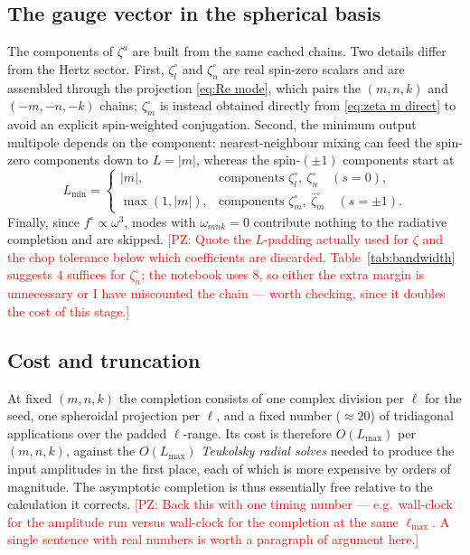 \documentclass[preprint,aps,nofootinbib,a4paper,superscriptaddress,longbibliography,amsfonts, amssymb,amsmath,titlepage]{revtex4-1}
\numberwithin{equation}{section} %
\newcommand{\PZ}[1]{\textcolor{red}{\textsf{[PZ: #1]}}}
\newcommand{\emm}{m}
\def\l{\ensuremath{\ell}}
\def\fHo{f^{\circ}}
\def\zetal{\zeta^{\circ}_{l}}
\def\zetan{\zeta^{\circ}_{n}}
\def\zetam{\zeta^{\circ}_{m}}
\def\zetamb{\bar\zeta^{\circ}_{m}}
\def\wmnk{\omega_{\emm n k}}
\begin{document}
\subsection{The gauge vector in the spherical basis}
\label{sec:kerr zeta}
The components of $\zeta^{a}$ are built from the same cached chains.  Two
details differ from the Hertz sector.  First, $\zetal$ and $\zetan$ are real
spin-zero scalars and are assembled through the projection
\eqref{eq:Re mode}, which pairs the $(\emm,n,k)$ and $(-\emm,-n,-k)$ chains;
$\zetam$ is instead obtained directly from \eqref{eq:zeta m direct} to avoid
an explicit spin-weighted conjugation.  Second, the minimum output multipole
depends on the component: nearest-neighbour mixing can feed the spin-zero
components down to $L=|\emm|$, whereas the spin-$(\pm1)$ components start at
\begin{equation}\label{eq:Lmin}
L_{\min}
=
\begin{cases}
|\emm| , & \text{components } \zetal,\ \zetan \quad (s=0),\\[2pt]
\max(1,|\emm|), & \text{components } \zetam,\ \zetamb \quad (s=\pm1).
\end{cases}
\end{equation}
Finally, since $\fHo\propto\omega^{3}$, modes with $\wmnk=0$ contribute
nothing to the radiative completion and are skipped.
\PZ{Quote the $L$-padding actually used for $\zeta$ and the chop tolerance
below which coefficients are discarded.  Table~\ref{tab:bandwidth} suggests
$4$ suffices for $\zetan$; the notebook uses $8$, so either the extra margin
is unnecessary or I have miscounted the chain --- worth checking, since it
doubles the cost of this stage.}

\subsection{Cost and truncation}
\label{sec:kerr cost}
At fixed $(\emm,n,k)$ the completion consists of one complex division per
$\l$ for the seed, one spheroidal projection per $\l$, and a fixed number
($\approx20$) of tridiagonal applications over the padded $\l$-range.  Its
cost is therefore $O(L_{\max})$ per $(\emm,n,k)$, against the
$O(L_{\max})$ \emph{Teukolsky radial solves} needed to produce the input
amplitudes in the first place, each of which is more expensive by orders of
magnitude.  The asymptotic completion is thus essentially free relative to
the calculation it corrects.
\PZ{Back this with one timing number --- e.g.\ wall-clock for the amplitude
run versus wall-clock for the completion at the same $\l_{\max}$.  A single
sentence with real numbers is worth a paragraph of argument here.}
\end{document}
